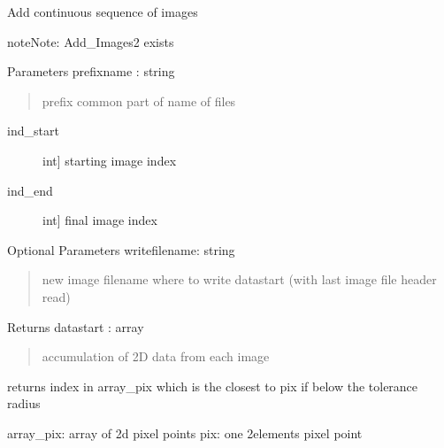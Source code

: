 \documentclass[letterpaper,10pt,english]{sphinxmanual}
\begin{document}
\begin{fulllineitems}
\label{\detokenize{PeakSearch:LaueTools.readmccd.Add_Images}}
Add continuous sequence of images

\begin{sphinxadmonition}{note}{Note:}
Add\_Images2 exists
\end{sphinxadmonition}

Parameters
prefixname : string
\begin{quote}

prefix common part of name of files
\end{quote}
\begin{description}
\item[{ind\_start}] \leavevmode{[}int{]}
starting image index

\item[{ind\_end}] \leavevmode{[}int{]}
final image index

\end{description}

Optional Parameters
writefilename: string
\begin{quote}

new image filename where to write datastart (with last image file header read)
\end{quote}

Returns
datastart : array
\begin{quote}

accumulation of 2D data from each image
\end{quote}

\end{fulllineitems}


\begin{fulllineitems}
\label{\detokenize{PeakSearch:LaueTools.readmccd.diff_pix}}
returns
index in array\_pix which is the closest to pix if below the tolerance radius

array\_pix: array of 2d pixel points
pix: one 2elements pixel point

\end{fulllineitems}
\end{document}
